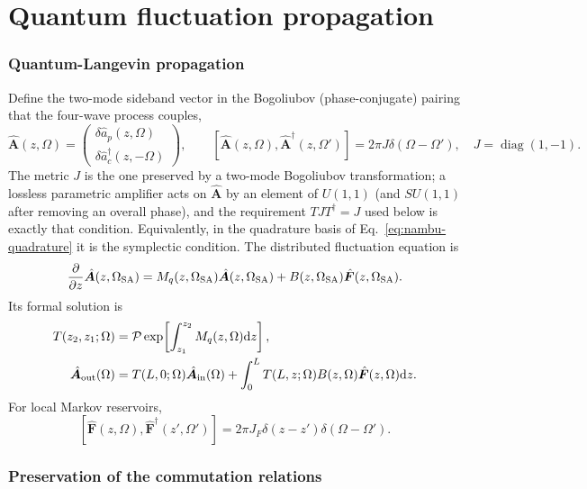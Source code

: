 \documentclass[11pt,a4paper]{article}
\newcommand{\dd}{\mathrm d}
\begin{document}
\part{Quantum fluctuation propagation}

\section{Quantum-Langevin propagation}

Define the two-mode sideband vector in the Bogoliubov (phase-conjugate)
pairing that the four-wave process couples,
\begin{equation}
\hat{\bm A}(z,\Omega)=
\begin{pmatrix}
\delta\hat a_p(z,\Omega)\\
\delta\hat a_c^\dagger(z,-\Omega)
\end{pmatrix},\qquad
[\hat{\bm A}(z,\Omega),\hat{\bm A}^\dagger(z,\Omega')]
=2\pi J\delta(\Omega-\Omega'),
\quad J=\operatorname{diag}(1,-1).
\label{eq:nambu}
\end{equation}
The metric $J$ is the one preserved by a two-mode Bogoliubov transformation;
a lossless parametric amplifier acts on $\hat{\bm A}$ by an element of
$U(1,1)$ (and $SU(1,1)$ after removing an overall phase), and the requirement $TJT^\dagger=J$ used below is exactly that
condition. Equivalently, in the quadrature basis of
Eq.~\eqref{eq:nambu-quadrature} it is the symplectic condition.
The distributed fluctuation equation is
\begin{equation}
\frac{\partial}{\partial z}\hat{\bm A}(z,\Omega_{\rm SA})
=M_q(z,\Omega_{\rm SA})\hat{\bm A}(z,\Omega_{\rm SA})
+B(z,\Omega_{\rm SA})\hat{\bm F}(z,\Omega_{\rm SA}).
\label{eq:langevin}
\end{equation}
Its formal solution is
\begin{align}
T(z_2,z_1;\Omega)&=
\mathcal P\exp\!\left[\int_{z_1}^{z_2}M_q(z,\Omega)\dd z\right],\\
\hat{\bm A}_{\rm out}(\Omega)&=
T(L,0;\Omega)\hat{\bm A}_{\rm in}(\Omega)
+\int_0^L T(L,z;\Omega)B(z,\Omega)\hat{\bm F}(z,\Omega)\dd z .
\label{eq:langevin-solution}
\end{align}
For local Markov reservoirs,
\[
[\hat{\bm F}(z,\Omega),\hat{\bm F}^\dagger(z',\Omega')]
=2\pi J_F\delta(z-z')\delta(\Omega-\Omega').
\]

\section{Preservation of the commutation relations}
\label{sec:realizability}
\end{document}
